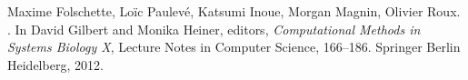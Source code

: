 \begin{frame}[c]

\tcitebullet Maxime Folschette, Loïc Paulevé, Katsumi Inoue, Morgan Magnin, Olivier Roux. . In David Gilbert and Monika Heiner, editors, \textit{Computational Methods in Systems Biology X}, Lecture Notes in Computer Science, 166--186. Springer Berlin Heidelberg, 2012.




\vfill
\Large
\begin{flushright}
  \hspace{1cm}~
\end{flushright}
\vfill

~

\end{frame}
